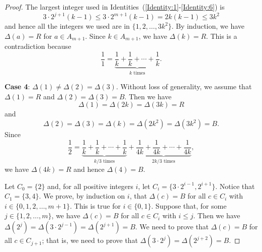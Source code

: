 \documentclass[10pt,a4paper]{amsart}
\begin{document}
\begin{proof}
The largest integer used in Identities~(\ref{Identity:1}-\ref{Identity:6}) is
\[
3\cdot2^{j+1}(k-1)\leq 3\cdot2^{m+1}(k-1)=2k(k-1)\leq 3k^2
\]
and hence all the integers we used are in $\{1,2,\ldots,3k^2\}$. By induction, we have $\Delta(a)=R$ for $a\in A_{m+1}$. Since $k\in A_{m+1}$, we have $\Delta(k)=R$. This is a contradiction because
\[
\frac{1}{1}=\underbrace{\frac{1}{k}+\frac{1}{k}+\cdots+\frac{1}{k}}_{k\text{ times}}.
\]

\textbf{Case 4}: $\Delta(1)\neq\Delta(2)=\Delta(3)$. Without loss of generality, we assume that $\Delta(1)=R$ and $\Delta(2)=\Delta(3)=B$. Then we have
\[
\Delta(1)=\Delta(2k)=\Delta(3k)=R
\]
and
\[
\Delta(2)=\Delta(3)=\Delta(k)=\Delta(2k^2)=\Delta(3k^2)=B.
\]
Since
\[
\frac{1}{2}=\underbrace{\frac{1}{k}+\frac{1}{k}+\cdots+\frac{1}{k}}_{k/3\text{ times}}+\underbrace{\frac{1}{4k}+\frac{1}{4k}+\cdots+\frac{1}{4k}}_{2k/3\text{ times}},
\]
we have $\Delta(4k)=R$ and hence $\Delta(4)=B$.

Let $C_0=\{2\}$ and, for all positive integers $i$, let $C_i=\{3\cdot2^{i-1},2^{i+1}\}$. Notice that $C_1=\{3,4\}$. We prove, by induction on $i$, that $\Delta(c)=B$ for all $c\in C_i$ with $i\in\{0,1,2,\ldots,m+1\}$. This is true for $i\in\{0,1\}$. Suppose that, for some $j\in\{1,2,\ldots,m\}$, we have $\Delta(c)=B$ for all $c\in C_i$ with $i\leq j$. Then we have $\Delta(2^j)=\Delta(3\cdot2^{j-1})=\Delta(2^{j+1})=B$. We need to prove that $\Delta(c)=B$ for all $c\in C_{j+1}$; that is, we need to prove that $\Delta(3\cdot2^{j})=\Delta(2^{j+2})=B$. 


\end{proof}
\end{document}
